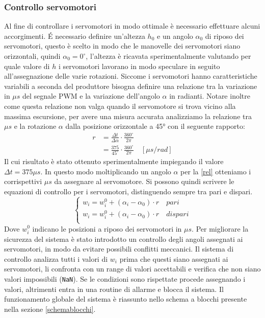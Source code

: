 \documentclass[12pt,twoside,openright]{article}
\begin{document}
\subsubsection{Controllo servomotori}
Al fine di controllare i servomotori in modo ottimale è necessario effettuare alcuni accorgimenti.
É necessario definire un'altezza $h_0$ e un angolo $\alpha_0$ di riposo dei servomotori, questo è scelto in modo che le manovelle dei servomotori siano orizzontali, quindi $\alpha_0=0^\circ$, l'altezza è ricavata sperimentalmente valutando per quale valore di $h$ i servomotori lavorano in modo speculare in seguito all'assegnazione delle varie rotazioni.
Siccome i servomotori hanno caratteristiche variabili a seconda del produttore bisogna definire una relazione tra la variazione in $\mu s$ del segnale PWM e la variazione dell'angolo $\alpha$ in radianti. Notare inoltre come questa relazione non valga quando il servomotore si trova vicino alla massima escursione, per avere una misura accurata analizziamo la relazione tra $\mu s$ e la rotazione $\alpha$ dalla posizione orizzontale a 45° con il seguente rapporto:
\begin{align}\label{rel}
r &=\frac{\Delta t}{\Delta\alpha}\cdot \frac{360^\circ}{2 \pi}\nonumber\\
	&= \frac{375}{45^\circ}\cdot \frac{360^\circ}{2 \pi} \quad [\mu s/rad]
\end{align}
Il cui risultato è stato ottenuto sperimentalmente impiegando il valore $\Delta t = 375 \mu s$. In questo modo moltiplicando un angolo $\alpha$ per la \eqref{rel} otteniamo i corrispettivi $\mu s$ da assegnare al servomotore. Si possono quindi scrivere le equazioni di controllo per i servomotori, distinguendo sempre tra pari e dispari.
\begin{equation}\label{w}
    \begin{cases}
      w_i=w_i^0 +(\alpha_i-\alpha_0)\cdot r	\quad pari \\
      w_i=w_i^0 +(\alpha_i-\alpha_0)\cdot r	\quad dispari \\
    \end{cases}
\end{equation}
Dove $w_i^0$ indicano le posizioni a riposo dei servomotori in $\mu s$.
Per migliorare la sicurezza del sistema è stato introdotto un controllo degli angoli assegnati ai servomotori, in modo da evitare possibili conflitti meccanici.
Il sistema di controllo analizza tutti i valori di $w_i$ prima che questi siano assegnati ai servomotori, li confronta con un range di valori accettabili e verifica che non siano valori impossibili (\texttt{NaN}).
Se le condizioni sono rispettate procede assegnando i valori, altrimenti entra in una routine di allarme e blocca il sistema. Il funzionamento globale del sistema è riassunto nello schema a blocchi presente nella sezione \ref{schemablocchi}.
\end{document}
